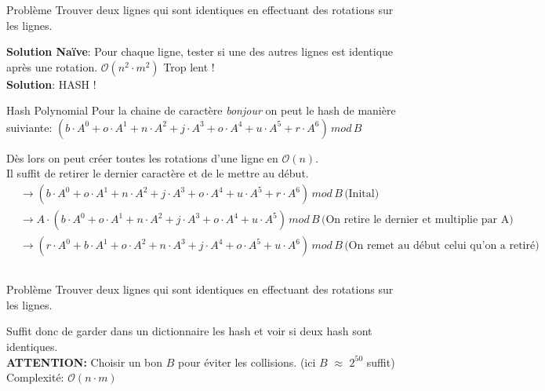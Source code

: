\begin{frame}
    \frametitle{\problemtitle}
        \begin{block}
            {Problème} Trouver deux lignes qui sont identiques en effectuant des rotations sur les lignes.
        \end{block}
        \pause
        \textbf{Solution Naïve}: Pour chaque ligne, tester si une des autres lignes est identique après une rotation. $\mathcal O(n^2 \cdot m^2)$ Trop lent !\\
        \pause
        \textbf{Solution}: HASH !
        \begin{block} {Hash Polynomial}
            Pour la chaine de caractère \textit{bonjour} on peut le hash de manière suiviante:
            $(b \cdot A^0 + o \cdot A^1 + n \cdot A^2 + j \cdot A^3 + o \cdot A^4 + u \cdot A^5 + r \cdot A^6) \, mod \, B$
        \end{block}
        \pause
        Dès lors on peut créer toutes les rotations d'une ligne en $\mathcal O(n)$.\\
        Il suffit de retirer le dernier caractère et de le mettre au début.
        \pause
        \begin{align*}
           &\rightarrow (b \cdot A^0 + o \cdot A^1 + n \cdot A^2 + j \cdot A^3 + o \cdot A^4 + u \cdot A^5 + r \cdot A^6) \, mod \, B \,\text{(Inital)}\\
           &\rightarrow A \cdot (b \cdot A^0 + o \cdot A^1 + n \cdot A^2 + j \cdot A^3 + o \cdot A^4 + u \cdot A^5) \, mod \, B\, \text{(On retire le dernier et multiplie par A)}\\
           &\rightarrow (r \cdot A^0 + b \cdot A^1 + o \cdot A^2 + n \cdot A^3 + j \cdot A^4 + o \cdot A^5 + u \cdot A^6) \, mod \, B\, \text{(On remet au début celui qu'on a retiré)}\\
        \end{align*}
        \pause
\end{frame}
\begin{frame}
    \frametitle{\problemtitle}
        \begin{block}
            {Problème} Trouver deux lignes qui sont identiques en effectuant des rotations sur les lignes.
        \end{block}
    Suffit donc de garder dans un dictionnaire les hash et voir si deux hash sont identiques.\\
    \textbf{ATTENTION:} Choisir un bon $B$ pour éviter les collisions. (ici $B$ $\approx$ $2^{50}$ suffit)\\
    \pause
    Complexité: $\mathcal O(n \cdot m)$
\end{frame}
